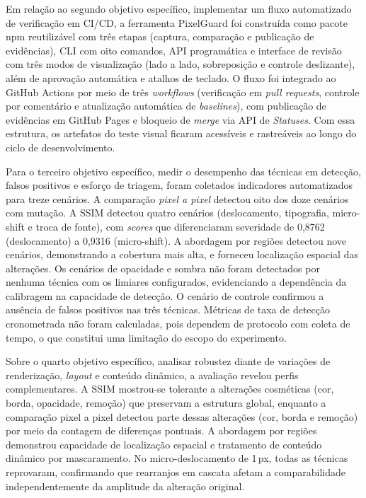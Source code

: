 \documentclass{UNESC}
\begin{document}
Em relação ao segundo objetivo específico, implementar um fluxo automatizado de verificação em CI/CD, a ferramenta PixelGuard foi construída como pacote npm reutilizável com três etapas (captura, comparação e publicação de evidências), CLI com oito comandos, API programática e interface de revisão com três modos de visualização (lado a lado, sobreposição e controle deslizante), além de aprovação automática e atalhos de teclado. O fluxo foi integrado ao GitHub Actions por meio de três \emph{workflows} (verificação em \emph{pull requests}, controle por comentário e atualização automática de \emph{baselines}), com publicação de evidências em GitHub Pages e bloqueio de \emph{merge} via API de \emph{Statuses}. Com essa estrutura, os artefatos do teste visual ficaram acessíveis e rastreáveis ao longo do ciclo de desenvolvimento.

Para o terceiro objetivo específico, medir o desempenho das técnicas em detecção, falsos positivos e esforço de triagem, foram coletados indicadores automatizados para treze cenários. A comparação \emph{pixel a pixel} detectou oito dos doze cenários com mutação. A SSIM detectou quatro cenários (deslocamento, tipografia, micro-shift e troca de fonte), com \emph{scores} que diferenciaram severidade de 0,8762 (deslocamento) a 0,9316 (micro-shift). A abordagem por regiões detectou nove cenários, demonstrando a cobertura mais alta, e forneceu localização espacial das alterações. Os cenários de opacidade e sombra não foram detectados por nenhuma técnica com os limiares configurados, evidenciando a dependência da calibragem na capacidade de detecção. O cenário de controle confirmou a ausência de falsos positivos nas três técnicas. Métricas de taxa de detecção cronometrada não foram calculadas, pois dependem de protocolo com coleta de tempo, o que constitui uma limitação do escopo do experimento.

Sobre o quarto objetivo específico, analisar robustez diante de variações de renderização, \emph{layout} e conteúdo dinâmico, a avaliação revelou perfis complementares. A SSIM mostrou-se tolerante a alterações cosméticas (cor, borda, opacidade, remoção) que preservam a estrutura global, enquanto a comparação pixel a pixel detectou parte dessas alterações (cor, borda e remoção) por meio da contagem de diferenças pontuais. A abordagem por regiões demonstrou capacidade de localização espacial e tratamento de conteúdo dinâmico por mascaramento. No micro-deslocamento de 1\,px, todas as técnicas reprovaram, confirmando que rearranjos em cascata afetam a comparabilidade independentemente da amplitude da alteração original.
\end{document}

